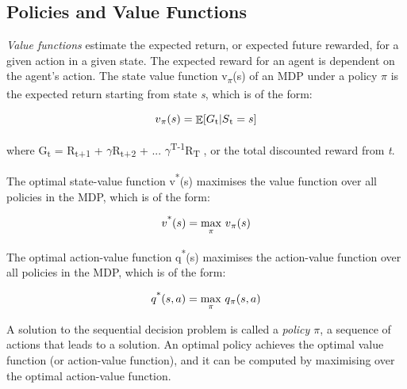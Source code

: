 \documentclass[12pt,twoside]{report}
\DeclareMathOperator{\E}{\mathbb{E}}
\begin{document}
\subsection{Policies and Value Functions}
\label{policy_value_functions_subsection}

\textit{Value functions} estimate the expected return, or expected future rewarded,  for a given action in a given state. The expected reward for an agent is dependent on the agent's action.  The state value function v\textsubscript{$\pi$}(s) of an MDP under a policy $\pi$ is the expected return starting from state \textit{s}, which is of the form:

\begin{equation}
v\textsubscript{$\pi$}(s) = \displaystyle \E [G\textsubscript{t} \vert S\textsubscript{t} = s]
\end{equation}

where G\textsubscript{t} = R\textsubscript{t+1} + $\gamma$R\textsubscript{t+2} + ... $\gamma$\textsuperscript{T-1}R\textsubscript{T} , or the total discounted reward from \textit{t}.

The optimal state-value function v\textsuperscript{*}(s) maximises the value function over all policies in the MDP, which is of the form:

\begin{equation}
v\textsuperscript{*}(s) = \underset{\pi}{\max} \ v\textsubscript{$\pi$}(s)
\end{equation}

The optimal action-value function q\textsuperscript{*}(s) maximises the action-value function over all policies in the MDP, which is of the form: 

\begin{equation}
q\textsuperscript{*}(s, a) = \underset{\pi}{\max} \ q\textsubscript{$\pi$}(s, a)
\end{equation}

A solution to the sequential decision problem is called a \textit{policy $\pi$}, a sequence of actions that leads to a solution. An optimal policy achieves the optimal value function (or action-value function), and it can be computed by maximising over the optimal action-value function.  
\end{document}
